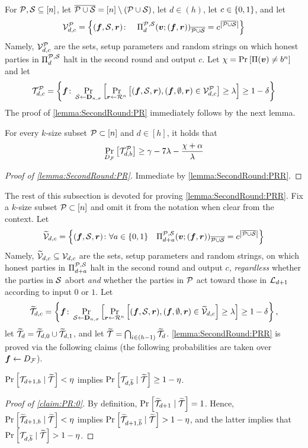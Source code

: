 For $\mathcal{P}, \mathcal{S} \subseteq [n]$, let ${\overline{\mathcal{P} \cup \mathcal{S}}} = [n] \setminus (\mathcal{P} \cup {\cal{S}})$, let $d\in (h)$, let $c\in \{0,1\}$, and let
\[
\mathcal{V}^{\mathcal{P}}_{d,c} = \left\{({ \boldsymbol{f}},{\cal{S}},{ \boldsymbol{r}}) \colon \quad \Pi^{\mathcal{P},\mathcal{S}}_d({ \boldsymbol{v}};({ \boldsymbol{f}},{ \boldsymbol{r}}))_{\overline{\mathcal{P} \cup \mathcal{S}}} = c^{\left|{\overline{\mathcal{P} \cup \mathcal{S}}}\right|}\right\}
\]
Namely, $\mathcal{V}^{\mathcal{P}}_{d,c}$ are the sets, setup parameters and random strings on which honest parties in $\Pi^{\mathcal{P},\mathcal{S}}_{d}$ halt in the second round and output $c$. Let $\chi = \Pr_{}\left[ \Pi({ \boldsymbol{v}}) \ne b^n\right]$ and let
\[
\mathcal{T}_{d,c}^{\mathcal{P}} = \left\{{ \boldsymbol{f}} \colon \Pr_{{\cal{S}} \gets \mathbf{D}_{n,\sigma}}\left[\Pr_{{ \boldsymbol{r}} \gets \mathcal{R}^n}\left[({ \boldsymbol{f}},\mathcal{S},{ \boldsymbol{r}}),({ \boldsymbol{f}},\emptyset,{ \boldsymbol{r}}) \in \mathcal{V}^{\mathcal{P}}_{d,c} \right] \ge \lambda \right] \ge 1-\delta\right\}
\]
The proof of  \cref{lemma:SecondRound:PR} immediately follows by the next lemma.
\begin{lemma}\label{lemma:SecondRound:PRR}
For every $k$-size subset $\mathcal{P} \subset [n]$ and $d\in [h]$,
it holds that
\begin{align*}
\Pr_{ D_{\cal F}}\left[\mathcal{T}_{d,b}^{\mathcal{P}}\right] \ge \gamma- 7\lambda- \frac{\chi + \alpha }{\lambda}
\end{align*}
\end{lemma}
\begin{proof}[Proof of \cref{lemma:SecondRound:PR}]
Immediate by \cref{lemma:SecondRound:PRR}.
\end{proof}
\newcommand{\tV}{\widetilde{\cV}}
\newcommand{\tT}{{\widetilde{\cT}}}


The rest of this subsection is devoted for proving \cref{lemma:SecondRound:PRR}. Fix a $k$-size subset $\mathcal{P} \subset [n]$ and omit it from the notation when clear from the context.
Let
\[
\tV_{d,c} = \set{(\vf,\cs,\vr) \colon \forall a\in \zo \quad \PP_{d+a}(\vv;(\vf,\vr))_\ops = c^{\size{\ops}}}
\]
Namely, $\tV_{d,c} \subseteq \cV_{d,c}$ are the sets, setup parameters and random strings, on which honest parties in $\Pi^{\mathcal{P},\mathcal{S}}_{d+a}$ halt in the second round and output $c$, \emph{regardless} whether the parties in $\mathcal{S}$ abort \emph{and} whether the parties in $\mathcal{P}$ act toward those in ${\cal{L}}_{d+1}$ according to input $0$ or $1$.
Let
\[
\tT_{d,c} = \set{\vf \colon \ppr{\cs \gets \bns}{\ppr{\vr \gets \rn}{(\vf,\cS,\vr),(\vf,\emptyset,\vr) \in \tV_{d,c} } \ge \lambda} \ge 1-\delta},
\]
let $\tT_{d} = \tT_{d,0}\cup \tT_{d,1}$, and let $\tT = \bigcap_{i \in (h-1)}\tT_{d}$. \cref{lemma:SecondRound:PRR} is proved via the following claims (the following probabilities are taken over ${ \boldsymbol{f}} \gets D_{\cal F}$).


\begin{claim}\label{claim:PR:0}
	$\pr{\cT_{d+1,\o} \mid \tT} < \eta$ implies $\pr{\cT_{d,\oo} \mid \tT} \ge 1- \eta$.
\end{claim}
\begin{proof}[Proof of \cref{claim:PR:0}]
By definition, $\pr{\tT_{d+1} \mid \tT} =1$.	 Hence, $\pr{\tT_{d+1,\o} \mid \tT}< \eta$ implies $\pr{\tT_{d+1,\oo} \mid \tT}> 1 -\eta$, and the latter implies that $\pr{\cT_{d,\oo} \mid \tT}>  1 -\eta$.
\end{proof}


